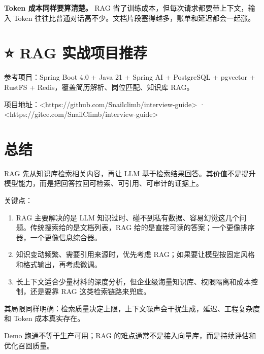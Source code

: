 \documentclass[9pt,a4paper,twocolumn]{ctexart}
\begin{document}
\textbf{Token 成本同样要算清楚。} RAG 省了训练成本，但每次请求都要带上下文，输入 Token 往往比普通对话高不少。文档片段塞得越多，账单和延迟都会一起涨。



\section*{⭐️ RAG 实战项目推荐}


参考项目：Spring Boot 4.0 + Java 21 + Spring AI + PostgreSQL + pgvector + RustFS + Redis，覆盖简历解析、岗位匹配、知识库 RAG。



项目地址：<https://github.com/Snailclimb/interview-guide> · <https://gitee.com/SnailClimb/interview-guide>



\section*{总结}


RAG 先从知识库检索相关内容，再让 LLM 基于检索结果回答。其价值不是提升模型能力，而是把回答拉回可检索、可引用、可审计的证据上。



关键点：


\begin{enumerate}[itemsep=1pt, topsep=2pt]
  \item RAG 主要解决的是 LLM 知识过时、碰不到私有数据、容易幻觉这几个问题。传统搜索给的是文档列表，RAG 给的是直接可读的答案；一个更像排序器，一个更像信息综合器。
  \item 知识变动频繁、需要引用来源时，优先考虑 RAG；如果要让模型按固定风格和格式输出，再考虑微调。
  \item 长上下文适合少量材料的深度分析，但企业级海量知识库、权限隔离和成本控制，还是要靠 RAG 这类检索链路来兜底。
\end{enumerate}


其局限同样明确：检索质量决定上限，上下文噪声会干扰生成，延迟、工程复杂度和 Token 成本真实存在。



Demo 跑通不等于生产可用；RAG 的难点通常不是接入向量库，而是持续评估和优化召回质量。
\end{document}
